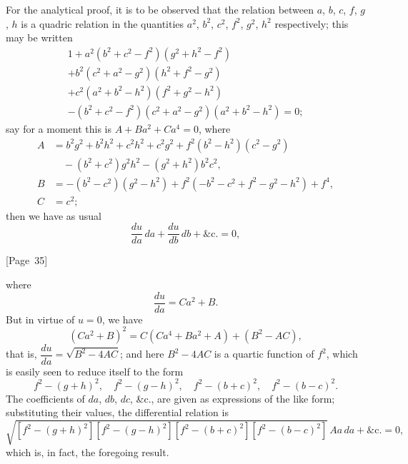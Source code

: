 \documentclass[11pt,a4paper]{book}
\begin{document}
For the analytical proof, it is to be observed that the relation
between $a$, $b$, $c$, $f$, $g$, $h$ is a quadric relation in the
quantities $a^2$, $b^2$, $c^2$, $f^2$, $g^2$, $h^2$ respectively;
this may be written
\begin{multline*}
1 + a^2(b^2 + c^2 - f^2)(g^2 + h^2 - f^2) \\
+ b^2(c^2 + a^2 - g^2)(h^2 + f^2 - g^2) \\
+ c^2(a^2 + b^2 - h^2)(f^2 + g^2 - h^2) \\
- (b^2 + c^2 - f^2)(c^2 + a^2 - g^2)(a^2 + b^2 - h^2) = 0;
\end{multline*}
say for a moment this is $A + Ba^2 + Ca^4 = 0$, where
\begin{align*}
A &= b^2g^2 + b^2h^2 + c^2h^2 + c^2g^2 + f^2(b^2 - h^2)(c^2 - g^2) \\
  &\quad - (b^2 + c^2)g^2h^2 - (g^2 + h^2)b^2c^2, \\
B &= -(b^2 - c^2)(g^2 - h^2) + f^2(-b^2 - c^2 + f^2 - g^2 - h^2) + f^4, \\
C &= c^2;
\end{align*}
then we have as usual
\[
\frac{du}{da}\,da + \frac{du}{db}\,db + \&\text{c.} = 0,
\]

\begin{center}
[Page~35]
\end{center}

where
\[
\frac{du}{da} = Ca^2 + B.
\]
But in virtue of $u = 0$, we have
\[
(Ca^2 + B)^2 = C(Ca^4 + Ba^2 + A) + (B^2 - AC),
\]
that is, $\dfrac{du}{da} = \sqrt{B^2 - 4AC}$;
and here $B^2 - 4AC$ is a quartic function of $f^2$, which is easily seen
to reduce itself to the form
\[
f^2 - (g+h)^2, \quad f^2 - (g-h)^2, \quad f^2 - (b+c)^2, \quad f^2 - (b-c)^2.
\]
The coefficients of $da$, $db$, $dc$, \&c., are given as expressions of
the like form; substituting their values, the differential relation is
\[
\sqrt{[f^2 - (g+h)^2][f^2 - (g-h)^2][f^2 - (b+c)^2][f^2 - (b-c)^2]}\, Aa\,da
+ \&\text{c.} = 0,
\]
which is, in fact, the foregoing result.
\end{document}
